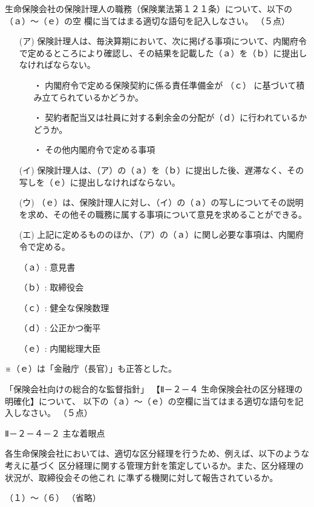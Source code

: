 \documentclass[report,gutter=10mm,fore-edge=10mm,uplatex,dvipdfmx]{jlreq}
\begin{document}
生命保険会社の保険計理人の職務（保険業法第１２１条）について、以下の（ａ）～（ｅ）の空
欄に当てはまる適切な語句を記入しなさい。
（５点）

\begin{itemize}
\item[(ア)] 保険計理人は、毎決算期において、次に掲げる事項について、内閣府令で定めるところにより確認し、その結果を記載した（ａ）を（ｂ）に提出しなければならない。
\begin{itemize}
\item[・]  内閣府令で定める保険契約に係る責任準備金が （ｃ） に基づいて積み立てられているかどうか。
\item[・]  契約者配当又は社員に対する剰余金の分配が（ｄ）に行われているかどうか。
\item[・]  その他内閣府令で定める事項
\end{itemize}
\item[(イ)] 保険計理人は、（ア）の（ａ）を（ｂ）に提出した後、遅滞なく、その写しを（ｅ）に提出しなければならない。
\item[(ウ)] （ｅ）は、保険計理人に対し、（イ）の（ａ）の写しについてその説明を求め、その他その職務に属する事項について意見を求めることができる。
\item[(エ)] 上記に定めるもののほか、（ア）の（ａ）に関し必要な事項は、内閣府令で定める。
\end{itemize}

\answer{}
\begin{itemize}
\item[ （ａ）: ] 意見書
\item[ （ｂ）: ] 取締役会
\item[ （ｃ）: ] 健全な保険数理
\item[ （ｄ）: ] 公正かつ衡平
\item[ （ｅ）: ] 内閣総理大臣
\end{itemize}
※（ｅ）は「金融庁（長官）」も正答とした。

「保険会社向けの総合的な監督指針」
【Ⅱ－２－４ 生命保険会社の区分経理の明確化】について、
以下の（ａ）～（ｅ）の空欄に当てはまる適切な語句を記入しなさい。
（５点）

Ⅱ－２－４－２ 主な着眼点

各生命保険会社においては、適切な区分経理を行うため、例えば、以下のような考えに基づく
区分経理に関する管理方針を策定しているか。また、区分経理の状況が、取締役会その他これ
に準ずる機関に対して報告されているか。

（１）〜（６） （省略）
\end{document}
